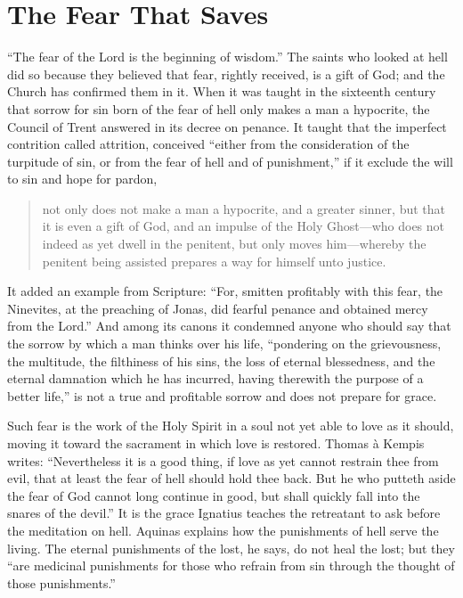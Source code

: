 \section{The Fear That Saves}

``The fear of the Lord is the beginning of wisdom.'' The saints who looked at hell did so because they believed that fear, rightly received, is a gift of God; and the Church has confirmed them in it. When it was taught in the sixteenth century that sorrow for sin born of the fear of hell only makes a man a hypocrite, the Council of Trent answered in its decree on penance. It taught that the imperfect contrition called attrition, conceived ``either from the consideration of the turpitude of sin, or from the fear of hell and of punishment,'' if it exclude the will to sin and hope for pardon,

\begin{quote}
not only does not make a man a hypocrite, and a greater sinner, but that it is even a gift of God, and an impulse of the Holy Ghost---who does not indeed as yet dwell in the penitent, but only moves him---whereby the penitent being assisted prepares a way for himself unto justice.
\end{quote}

\noindent It added an example from Scripture: ``For, smitten profitably with this fear, the Ninevites, at the preaching of Jonas, did fearful penance and obtained mercy from the Lord.'' And among its canons it condemned anyone who should say that the sorrow by which a man thinks over his life, ``pondering on the grievousness, the multitude, the filthiness of his sins, the loss of eternal blessedness, and the eternal damnation which he has incurred, having therewith the purpose of a better life,'' is not a true and profitable sorrow and does not prepare for grace.

Such fear is the work of the Holy Spirit in a soul not yet able to love as it should, moving it toward the sacrament in which love is restored. Thomas \`a Kempis writes: ``Nevertheless it is a good thing, if love as yet cannot restrain thee from evil, that at least the fear of hell should hold thee back. But he who putteth aside the fear of God cannot long continue in good, but shall quickly fall into the snares of the devil.'' It is the grace Ignatius teaches the retreatant to ask before the meditation on hell. Aquinas explains how the punishments of hell serve the living. The eternal punishments of the lost, he says, do not heal the lost; but they ``are medicinal punishments for those who refrain from sin through the thought of those punishments.''

